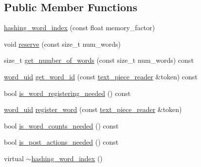 \subsection*{Public Member Functions}
\begin{DoxyCompactItemize}
\item 
\hyperlink{classuva_1_1smt_1_1bpbd_1_1server_1_1lm_1_1dictionary_1_1hashing__word__index_a9e8eaf9a1c9ad275054e08123077c0e3}{hashing\+\_\+word\+\_\+index} (const float memory\+\_\+factor)
\item 
void \hyperlink{classuva_1_1smt_1_1bpbd_1_1server_1_1lm_1_1dictionary_1_1hashing__word__index_ad6c3355af70f7fe393d550ba1ef80eaf}{reserve} (const size\+\_\+t num\+\_\+words)
\item 
size\+\_\+t \hyperlink{classuva_1_1smt_1_1bpbd_1_1server_1_1lm_1_1dictionary_1_1hashing__word__index_ad90a3b5d230d14369f1e9caeb0daceb3}{get\+\_\+number\+\_\+of\+\_\+words} (const size\+\_\+t num\+\_\+words) const 
\item 
\hyperlink{namespaceuva_1_1smt_1_1bpbd_1_1server_a6bfe45ba344d65a7fdd7d26156328ddc}{word\+\_\+uid} \hyperlink{classuva_1_1smt_1_1bpbd_1_1server_1_1lm_1_1dictionary_1_1hashing__word__index_a2d75d2794c4b8d1bb39a88b556858c7f}{get\+\_\+word\+\_\+id} (const \hyperlink{classuva_1_1utils_1_1file_1_1text__piece__reader}{text\+\_\+piece\+\_\+reader} \&token) const 
\item 
bool \hyperlink{classuva_1_1smt_1_1bpbd_1_1server_1_1lm_1_1dictionary_1_1hashing__word__index_a494bd9b1e49904deee1f8234e83cc481}{is\+\_\+word\+\_\+registering\+\_\+needed} () const 
\item 
\hyperlink{namespaceuva_1_1smt_1_1bpbd_1_1server_a6bfe45ba344d65a7fdd7d26156328ddc}{word\+\_\+uid} \hyperlink{classuva_1_1smt_1_1bpbd_1_1server_1_1lm_1_1dictionary_1_1hashing__word__index_a609edbe27e59ba18613ecc5e73e26994}{register\+\_\+word} (const \hyperlink{classuva_1_1utils_1_1file_1_1text__piece__reader}{text\+\_\+piece\+\_\+reader} \&token)
\item 
bool \hyperlink{classuva_1_1smt_1_1bpbd_1_1server_1_1lm_1_1dictionary_1_1hashing__word__index_ab8f071a53701f66b24cb9ea1e835cc66}{is\+\_\+word\+\_\+counts\+\_\+needed} () const 
\item 
bool \hyperlink{classuva_1_1smt_1_1bpbd_1_1server_1_1lm_1_1dictionary_1_1hashing__word__index_a06f3b8b334fd66631778e4db24d001d1}{is\+\_\+post\+\_\+actions\+\_\+needed} () const 
\item 
virtual \hyperlink{classuva_1_1smt_1_1bpbd_1_1server_1_1lm_1_1dictionary_1_1hashing__word__index_a9d0f52f1beec29b30d4d24d5d30118ad}{$\sim$hashing\+\_\+word\+\_\+index} ()
\end{DoxyCompactItemize}
